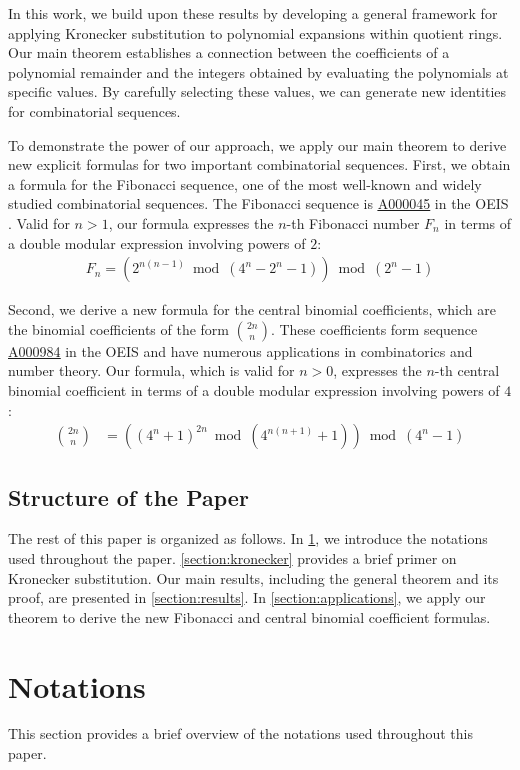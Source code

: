 \documentclass[12pt,reqno]{article}
\theoremstyle{plain}
\theoremstyle{definition}
\newcommand{\seqnum}[1]{\href{https://oeis.org/#1}{\rm \underline{#1}}}
\begin{document}
In this work, we build upon these results by developing a general framework for applying Kronecker substitution to polynomial expansions within quotient rings. Our main theorem establishes a connection between the coefficients of a polynomial remainder and the integers obtained by evaluating the polynomials at specific values. By carefully selecting these values, we can generate new identities for combinatorial sequences.

To demonstrate the power of our approach, we apply our main theorem to derive new explicit formulas for two important combinatorial sequences. First, we obtain a formula for the Fibonacci sequence, one of the most well-known and widely studied combinatorial sequences. The Fibonacci sequence is \seqnum{A000045} in the OEIS \cite{A000045}. Valid for $n > 1$, our formula expresses the $n$-th Fibonacci number $F_n$ in terms of a double modular expression involving powers of $2$:
\begin{align*}
    F_n = (2^{n(n-1)} \bmod{(4^n-2^n-1)}) \bmod{(2^n-1)}
\end{align*}

Second, we derive a new formula for the central binomial coefficients, which are the binomial coefficients of the form $\binom{2n}{n}$. These coefficients form sequence \seqnum{A000984} in the OEIS \cite{A000984} and have numerous applications in combinatorics and number theory. Our formula, which is valid for $n > 0$, expresses the $n$-th central binomial coefficient in terms of a double modular expression involving powers of $4$:
\begin{align*}
    \binom{2n}{n} &= ((4^n + 1)^{2n} \bmod{(4^{n(n+1)} + 1)}) \bmod{(4^n-1)}
\end{align*}

\subsection{Structure of the Paper}
The rest of this paper is organized as follows. In \cref{section:notations}, we introduce the notations used throughout the paper. \cref{section:kronecker} provides a brief primer on Kronecker substitution. Our main results, including the general theorem and its proof, are presented in \cref{section:results}. In \cref{section:applications}, we apply our theorem to derive the new Fibonacci and central binomial coefficient formulas.
\section{Notations} \label{section:notations}
This section provides a brief overview of the notations used throughout this paper.
\end{document}
